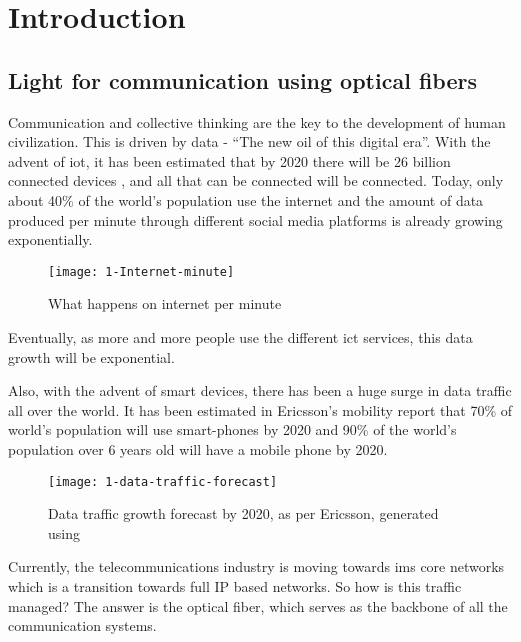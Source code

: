 \documentclass[../report.tex]{subfiles}
\begin{document}
	
	
\chapter{Introduction} 
	\section{Light for communication using optical fibers}
Communication and collective thinking are the key to the development of human civilization. This is driven by data - “The new oil of this digital era”. With the advent of \gls{iot}, it has been estimated that by 2020 there will be 26 billion connected devices \cite{gartner_iot}, and all that can be connected will be connected. Today, only about 40\% \cite{internet_users} of the world’s population use the internet and the amount of data produced per minute through different social media platforms is already growing exponentially. 

\begin{figure}[h]
	\centering
	\texttt{[image: 1-Internet-minute]}
	\caption{What happens on internet per minute \cite{internet_minute}}
	\label{fig:1_internet_minute}
\end{figure}
\noindent Eventually, as more and more people use the different \gls{ict} services, this data growth will be exponential. \par

Also, with the advent of smart devices, there has been a huge surge in data traffic all over the world. It has been estimated in Ericsson's mobility report \cite{ericsson_mobility_report} that 70\% of world's population will use smart-phones by 2020 and 90\% of the world's population over 6 years old will have a mobile phone by 2020. 
\begin{figure}[!tbp]
	\centering
	\texttt{[image: 1-data-traffic-forecast]}
	\caption{Data traffic growth forecast by 2020, as per Ericsson, generated using \cite{ericsson_traffic_exploration} \cite{internet_minute}}
	\label{fig:1_data_traffic_forecast}
\end{figure}

Currently, the telecommunications industry is moving towards \gls{ims} core networks which is a transition towards full IP based networks. So how is this traffic managed? The answer is the optical fiber, which serves as the backbone of all the communication systems. 
\end{document}
